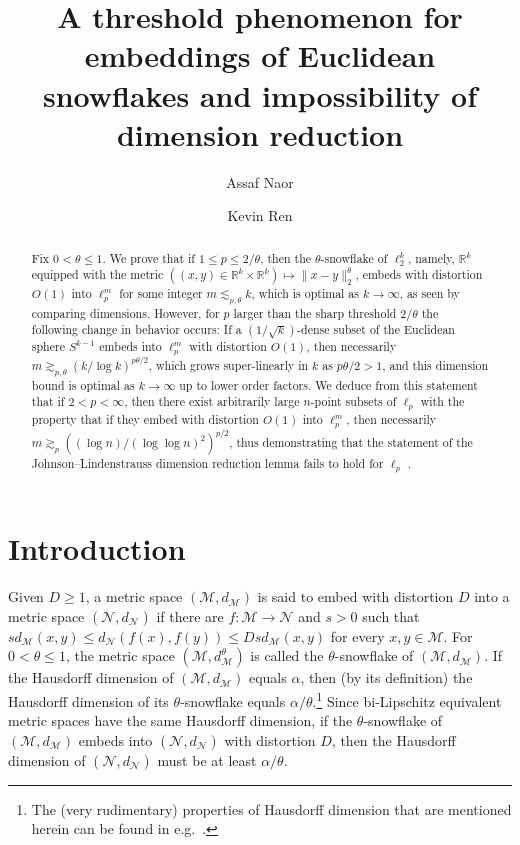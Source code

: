 \documentclass[11pt,reqno]{amsart}
\title{A threshold phenomenon for embeddings of Euclidean snowflakes and  impossibility of dimension reduction}
\date{}
\author{Assaf Naor}
\author{Kevin Ren}
\newcommand{\R}{\mathbb{R}}
\renewcommand{\le}{\leqslant}
\renewcommand{\ge}{\geqslant}
\newcommand{\NN}{\mathcal{N}}
\newcommand{\MM}{\mathcal{M}}
\newcommand{\1}{\mathbf{1}}
\begin{document}
\begin{abstract} Fix $0<\theta\le 1$. We prove that if $1\le p \le 2/\theta$, then the $\theta$-snowflake of $\ell_2^k$, namely, $\R^k$ equipped with the metric $((x,y)\in \R^k\times \R^k)\mapsto \|x-y\|_2^\theta$,  embeds with distortion $O(1)$ into $\ell_p^m$ for some integer $m\lesssim_{p,\theta}k$, which is optimal as $k\to \infty$, as seen by comparing dimensions. However, for $p$ larger than the sharp threshold $2/\theta$ the following change in behavior occurs: If a $(1/\sqrt{k})$-dense subset of the Euclidean sphere     $S^{k-1}$ embeds into $\ell_p^m$ with  distortion $O(1)$, then necessarily $m\gtrsim_{p,\theta}( k/\log k)^{p\theta/2}$, which grows super-linearly in $k$ as $p\theta/2>1$, and this dimension bound is optimal as $k\to \infty$ up to lower order factors. We deduce from this statement that if $2<p<\infty$, then there exist arbitrarily large $n$-point subsets of $\ell_p$ with the property that if they embed with distortion $O(1)$ into $\ell_p^m$, then necessarily $m\gtrsim_p ((\log n)/(\log\log n)^2)^{p/2}$, thus demonstrating that the statement of the Johnson--Lindenstrauss dimension reduction lemma  fails to hold for $\ell_p$ .
\end{abstract}

\maketitle

\vspace{-0.3in}





\section{Introduction}





Given $D\ge 1$, a metric space $(\MM,d_\MM)$ is said to embed with distortion $D$ into a metric space $(\NN,d_\NN)$ if there are $f:\MM\to \NN$ and $s>0$ such that $s d_\MM(x,y)\le d_\NN(f(x),f(y))\le Ds d_\MM(x,y)$ for every $x,y\in \MM$. For $0< \theta\le 1$, the metric space $(\MM,d_\MM^\theta)$ is  called the  $\theta$-snowflake of $(\MM,d_\MM)$. If the Hausdorff dimension of $(\MM,d_\MM)$ equals  $\alpha$, then (by its definition) the Hausdorff dimension of its $\theta$-snowflake equals $\alpha/\theta$.\footnote{The (very rudimentary) properties of Hausdorff dimension that are mentioned herein can be found in e.g.~\cite{Rog98}. } Since bi-Lipschitz equivalent metric spaces have the same Hausdorff dimension, if the $\theta$-snowflake of $(\MM,d_\MM)$ embeds into $(\NN,d_\NN)$ with distortion $D$, then the Hausdorff dimension of $(\NN,d_\NN)$ must be at least $\alpha/\theta$.
\end{document}
